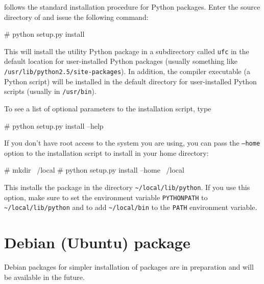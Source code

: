 \ufc{} follows the standard installation procedure for Python
packages. Enter the source directory of \ufc{} and issue the
following command:
\begin{code}
# python setup.py install
\end{code}
This will install the \ufc{} utility Python package in a subdirectory
called \texttt{ufc} in the default location for user-installed Python
packages (usually something like \texttt{/usr/lib/python2.5/site-packages}).
In addition, the compiler executable (a Python script) will be
installed in the default directory for user-installed Python scripts
(usually in \texttt{/usr/bin}).

To see a list of optional parameters to the installation script, type
\begin{code}
# python setup.py install --help
\end{code}
If you don't have root access to the system you are using, you can
pass the \texttt{--home} option to the installation script to install
\ufc{} in your home directory:
\begin{code}
# mkdir ~/local
# python setup.py install --home ~/local
\end{code}
This installs the \ufc{} package in the directory \texttt{\~{}/local/lib/python}.
If you use this option, make sure to set the environment variable \texttt{PYTHONPATH}
to \texttt{\~{}/local/lib/python} and to add \texttt{\~{}/local/bin}
to the \texttt{PATH} environment variable.


\section{Debian (Ubuntu) package}

Debian packages for simpler installation of \fenics{} packages are in preparation and will be available in the future.

